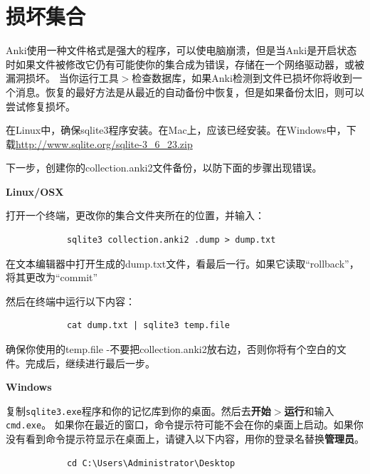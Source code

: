 \documentclass[a4paper]{book}
\begin{document}
		\section{损坏集合}
		
		Anki使用一种文件格式是强大的程序，可以使电脑崩溃，但是当Anki是开启状态时如果文件被修改它仍有可能使你的集合成为错误，存储在一个网络驱动器，或被漏洞损坏。              当你运行工具$>$检查数据库，如果Anki检测到文件已损坏你将收到一个消息。恢复的最好方法是从最近的自动备份中恢复，但是如果备份太旧，则可以尝试修复损坏。
		
		在Linux中，确保sqlite3程序安装。在Mac上，应该已经安装。在Windows中，下载\url{http://www.sqlite.org/sqlite-3_6_23.zip}
		
		下一步，创建你的collection.anki2文件备份，以防下面的步骤出现错误。
		
		\textbf{Linux/OSX}
		
		打开一个终端，更改你的集合文件夹所在的位置，并输入：
		
		\begin{shaded}\begin{verbatim}
			sqlite3 collection.anki2 .dump > dump.txt
			\end{verbatim}\end{shaded}
		
		在文本编辑器中打开生成的dump.txt文件，看最后一行。如果它读取“rollback”，将其更改为“commit”
		
		然后在终端中运行以下内容：
		
		\begin{shaded}\begin{verbatim}
			cat dump.txt | sqlite3 temp.file
			\end{verbatim}\end{shaded}
		
		确保你使用的temp.file -不要把collection.anki2放右边，否则你将有个空白的文件。完成后，继续进行最后一步。
		
		\textbf{Windows}
		
		复制\texttt{sqlite3.exe}程序和你的记忆库到你的桌面。然后去\textbf{开始$>$运行}和输入\texttt{cmd.exe}。              如果你在最近的窗口，命令提示符可能不会在你的桌面上启动。如果你没有看到命令提示符显示在桌面上，请键入以下内容，用你的登录名替换\textbf{管理员}。
		
		\begin{shaded}\begin{verbatim}
			cd C:\Users\Administrator\Desktop
			\end{verbatim}\end{shaded}
		
\end{document}
